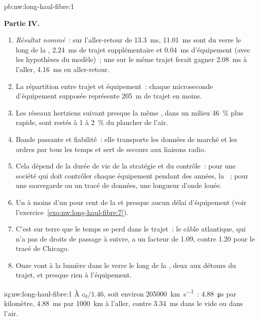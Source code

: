 \begin{solution}{pb:nw:long-haul-fibre:1}
\begin{enumerate}[resume]
\end{enumerate}
\textbf{Partie IV.}
\begin{enumerate}[resume]
\item \emph{Résultat nommé}~: sur l'aller-retour de \qty{13.3}{\milli\second}, \qty{11.01}{\milli\second} sont du verre le long de la ,
  \qty{2.24}{\milli\second} de trajet supplémentaire et \qty{0.04}{\milli\second} d'équipement (avec les hypothèses du modèle)~; une  sur le même trajet ferait
  gagner \qty{2.08}{\milli\second} à l'aller, \qty{4.16}{\milli\second} en aller-retour.
\item La répartition entre trajet et équipement~: chaque microseconde d'équipement supposée représente \qty{205}{\metre} de trajet en moins.
\item Les réseaux hertziens suivant presque la même , dans un milieu 46~\% plus rapide, sont restés à 1 à 2~\% du plancher de l'air.
\item Bande passante et fiabilité~: elle transporte les données de marché et les ordres par tous les temps et sert de secours aux liaisons radio.
\item Cela dépend de la durée de vie de la stratégie et du contrôle~: pour une société qui doit contrôler chaque équipement pendant des années, la ~; pour une
  sauvegarde ou un tracé de données, une longueur d'onde louée.
\item Un  à moins d'un pour cent de la  et presque aucun délai d'équipement (voir l'exercice~\ref{exo:nw:long-haul-fibre:7}).
\item C'est sur terre que le temps se perd dans le trajet~: le câble atlantique, qui n'a pas de droits de passage à suivre, a un facteur de 1.09, contre
  1.20 pour le tracé de Chicago.
\item Onze vont à la lumière dans le verre le long de la , deux aux détours du trajet, et presque rien à l'équipement.
\end{enumerate}
\end{solution}

\begin{solution}{iq:nw:long-haul-fibre:1}
À $c_0/1.46$, soit environ \qty{205000}{\kilo\metre\per\second}~: \qty{4.88}{\micro\second} par kilomètre, \qty{4.88}{\milli\second} par
\qty{1000}{\kilo\metre} à l'aller, contre \qty{3.34}{\milli\second} dans le vide ou dans l'air.
\end{solution}

